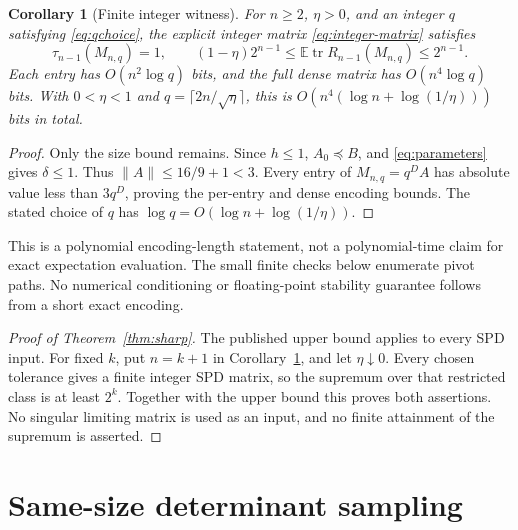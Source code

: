 \documentclass[10pt,letterpaper]{article}
\newtheorem{corollary}{Corollary}
\DeclareMathOperator{\tr}{tr}
\newcommand{\E}{\mathbb E}
\begin{document}
\begin{corollary}[Finite integer witness]\label{cor:integer}
For $n\geq2$, $\eta>0$, and an integer $q$ satisfying
\eqref{eq:qchoice}, the explicit integer matrix \eqref{eq:integer-matrix}
satisfies
\[
 \tau_{n-1}(M_{n,q})=1,\qquad
 (1-\eta)2^{n-1}\leq\E\tr R_{n-1}(M_{n,q})\leq2^{n-1}.
\]
Each entry has $O(n^2\log q)$ bits, and the full dense matrix has
$O(n^4\log q)$ bits. With $0<\eta<1$ and
$q=\lceil2n/\sqrt\eta\rceil$, this is
$O(n^4(\log n+\log(1/\eta)))$ bits in total.
\end{corollary}

\begin{proof}
Only the size bound remains. Since $h\leq1$, $A_0\preceq B$, and
\eqref{eq:parameters} gives $\delta\leq1$. Thus
$\|A\|\leq16/9+1<3$. Every entry of $M_{n,q}=q^DA$ has absolute
value less than $3q^D$, proving the per-entry and dense encoding bounds.
The stated choice of $q$ has
$\log q=O(\log n+\log(1/\eta))$.
\end{proof}

This is a polynomial encoding-length statement, not a polynomial-time
claim for exact expectation evaluation. The small finite checks below
enumerate pivot paths. No numerical conditioning or floating-point
stability guarantee follows from a short exact encoding.

\begin{proof}[Proof of Theorem~\ref{thm:sharp}]
The published upper bound applies to every SPD input. For fixed $k$, put
$n=k+1$ in Corollary~\ref{cor:integer}, and let $\eta\downarrow0$.
Every chosen tolerance gives a finite integer SPD matrix, so the supremum
over that restricted class is at least $2^k$. Together with the upper
bound this proves both assertions. No singular limiting matrix is used
as an input, and no finite attainment of the supremum is asserted.
\end{proof}

\section{Same-size determinant sampling}
\end{document}
